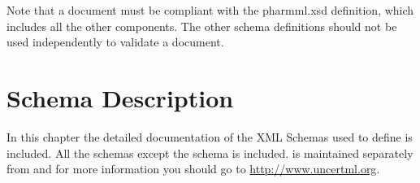 Note that a \pharmml document must be compliant with the pharmml.xsd
definition, which includes all the other components. The other schema
definitions should not be used independently to validate a \pharmml
document.

\chapter{Schema Description}
\label{chap:schema-defn}

In this chapter the detailed documentation of the XML
Schemas used to define \pharmml is included. All the schemas except
the \uncertml schema is included. \uncertml is maintained separately
from \pharmml and for more information you should go to
\url{http://www.uncertml.org}.

%













